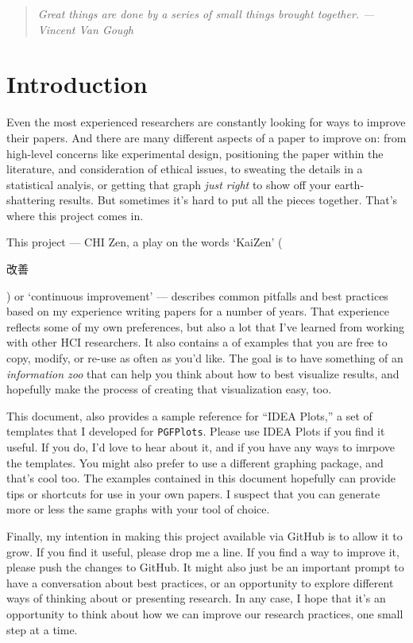 
\vspace{2em}
\begin{quote}
    \emph{Great things are done by a series of small things brought together. --- Vincent Van Gough}
\end{quote}


\section{Introduction}

Even the most experienced researchers are constantly looking for ways to improve their papers. And there are many different aspects of a paper to improve on: from high-level concerns like experimental design, positioning the paper within the literature, and consideration of ethical issues, to sweating the details in a statistical analyis, or getting that graph \emph{just right} to show off your earth-shattering results. But sometimes it's hard to put all the pieces together. That's where this project comes in. 

This project --- CHI Zen, a play on the words `KaiZen' (\begin{CJK}{UTF8}{min}改善\end{CJK}) or `continuous improvement' --- describes common pitfalls and best practices based on my experience writing papers for a number of years. That experience reflects some of my own preferences, but also a lot that I've learned from working with other HCI researchers. It also contains a  of examples that you are free to copy, modify, or re-use as often as you'd like. The goal is to have something of an \emph{information zoo} \cite{heer2010tour} that can help you think about how to best visualize results, and hopefully make the process of creating that visualization easy, too. 

This document, also provides a sample reference for ``IDEA Plots,'' a set of templates that I developed for \texttt{PGFPlots}. Please use IDEA Plots if you find it useful. If you do, I'd love to hear about it, and if you have any ways to imrpove the templates. You might also prefer to use a different graphing package, and that's cool too. The examples contained in this document hopefully can provide tips or shortcuts for use in your own papers. I suspect that you can generate more or less the same graphs with your tool of choice. 

Finally, my intention in making this project available via GitHub is to allow it to grow. If you find it useful, please drop me a line. If you find a way to improve it, please push the changes to GitHub. It might also just be an important prompt to have a conversation about best practices, or an opportunity to explore different ways of thinking about or presenting research. In any case, I hope that it's an opportunity to think about how we can improve our research practices, one small step at a time. 

